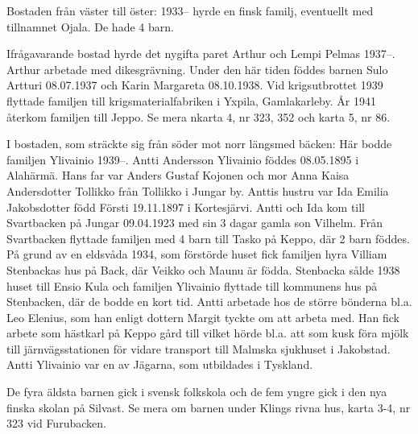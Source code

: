 Bostaden från väster till öster:
1933-- hyrde en finsk familj, eventuellt med tillnamnet Ojala. De hade 4 barn.

Ifrågavarande bostad hyrde det nygifta paret Arthur och Lempi	Pelmas 1937--. Arthur arbetade med dikesgrävning. Under den	här tiden föddes barnen Sulo Artturi 08.07.1937 och Karin	Margareta	08.10.1938. Vid krigsutbrottet 1939 flyttade familjen till	krigsmaterialfabriken i Yxpila, Gamlakarleby. År 1941 återkom familjen till Jeppo. Se mera nkarta 4, nr 323, 352 och karta 5, nr 86.

I bostaden, som sträckte sig från söder mot norr längsmed bäcken:
Här bodde	familjen Ylivainio 1939--. Antti Andersson Ylivainio föddes 08.05.1895 i Alahärmä. Hans far var Anders Gustaf Kojonen och mor Anna Kaisa Andersdotter Tollikko från Tollikko i Jungar by. Anttis hustru var Ida Emilia Jakobsdotter född Försti 19.11.1897 i Kortesjärvi. Antti och Ida kom till Svartbacken på Jungar 09.04.1923 med sin 3 	dagar gamla son Vilhelm. Från Svartbacken flyttade familjen med 4	barn till Tasko på Keppo, där 2 barn föddes. På grund av en eldsvåda 1934, som förstörde huset fick familjen hyra Villiam Stenbackas hus på	Back, där Veikko och Maunu är födda. Stenbacka sålde 1938 huset till Ensio Kula och familjen Ylivainio flyttade till kommunens hus på Stenbacken, där de bodde en kort tid. Antti arbetade hos de större 	bönderna bl.a. Leo Elenius, som han enligt dottern Margit tyckte om att arbeta med. Han fick arbete som hästkarl på Keppo gård till vilket hörde bl.a. att som kusk föra mjölk till järnvägsstationen för vidare transport till Malmska sjukhuset i Jakobstad. Antti Ylivainio var en av Jägarna, som utbildades i Tyskland.
\begin{jhchildren}
  \item {}
  \item {}
  \item {}
  \item {}
  \item {}
  \item {}
  \item {}
  \item {}
  \item {}
\end{jhchildren}
De fyra äldsta barnen gick i svensk folkskola och de fem yngre gick i den nya finska skolan på Silvast. Se mera om barnen under Klings rivna hus,	karta 3-4, nr 323 vid Furubacken.

